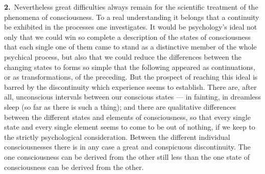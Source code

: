 \documentclass[12pt,a4paper]{book}
\newcommand{\opage}[1]{\marginnote{\footnotesize\textit{[#1]}}}
\begin{document}
\noindent\textbf{2.}~Nevertheless great difficulties always remain for the
scientific treatment of the phenomena of consciousness. To a real understanding
it belongs that a continuity be exhibited in the processes one investigates. It
would be psychology's ideal not only that we could win so complete a description
of the states of consciousness that each single one of them came to stand as a
distinctive member of the whole psychical process, but also that we could reduce
the differences between the changing states to forms so simple that the
following appeared as continuations, or as transformations, of the preceding.
But the prospect of reaching this ideal is barred by the discontinuity which
experience seems to establish. There are, after all, unconscious intervals
between our conscious states --- in fainting, in dreamless sleep (so far as
there is such a thing); and there are qualitative differences between the
different states and elements of consciousness, so that every single state and
every single element seems to come to be out of nothing, if we keep to the
strictly psychological consideration. Between the different individual
consciousnesses there is in any case a great \opage{13}and conspicuous discontinuity. The
one consciousness can be derived from the other still less than the one state of
consciousness can be derived from the other.
\end{document}
